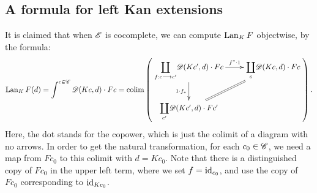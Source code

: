 \documentclass[11pt]{article}
\begin{document}
\begin{2. Kan Extensions}
\subsection*{A formula for left Kan extensions}
It is claimed that when $\mathscr{E}$ is cocomplete, we can compute $\operatorname{Lan}_KF$ objectwise, by the formula:
\[\Lan_KF(d)=\int^{c\in\scrC}\scrD(Kc,d)\cdot Fc=
\colim\left(\vcenter{\xymatrix{
{\displaystyle\coprod_{f:c\to c'}}\scrD(Kc',d)\cdot Fc\ar[r]^-{f^*\cdot1}\ar[d]_-{1\cdot f_*}&%
{\displaystyle\coprod_{c}}\scrD(Kc,d)\cdot Fc\ar@{=}[ld]\\%
{\displaystyle\coprod_{c'}}\scrD(Kc',d)\cdot Fc'&%
}}\right)
.\]
Here, the dot stands for the copower, which is just the colimit of a diagram with no arrows. In order to get the natural transformation, for each $c_0\in\mathscr{C}$, we need a map from $Fc_0$ to this colimit with $d=Kc_0$. 
Note that there is a distinguished copy of $Fc_0$ in the upper left term, where we set $f=\textup{id}_{c_0}$, and use the copy of $Fc_0$  corresponding to $\textup{id}_{Kc_0}$.


\end{2. Kan Extensions}
\end{document}
